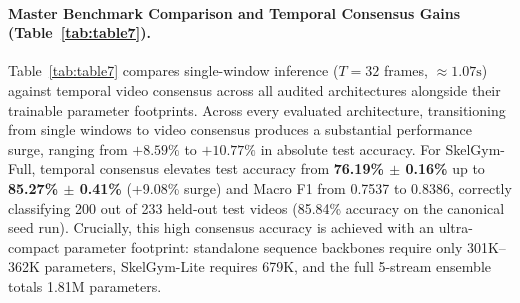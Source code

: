 \documentclass[runningheads]{llncs}
\begin{document}
\paragraph{Master Benchmark Comparison and Temporal Consensus Gains (Table~\ref{tab:table7}).}
Table~\ref{tab:table7} compares single-window inference ($T=32$ frames, $\approx 1.07\text{s}$) against temporal video consensus across all audited architectures alongside their trainable parameter footprints. Across every evaluated architecture, transitioning from single windows to video consensus produces a substantial performance surge, ranging from $+8.59\%$ to $+10.77\%$ in absolute test accuracy. For SkelGym-Full, temporal consensus elevates test accuracy from \textbf{76.19\% $\pm$ 0.16\%} up to \textbf{85.27\% $\pm$ 0.41\%} (+9.08\% surge) and Macro F1 from 0.7537 to 0.8386, correctly classifying 200 out of 233 held-out test videos (85.84\% accuracy on the canonical seed run). Crucially, this high consensus accuracy is achieved with an ultra-compact parameter footprint: standalone sequence backbones require only 301K--362K parameters, SkelGym-Lite requires 679K, and the full 5-stream ensemble totals 1.81M parameters.
\end{document}
